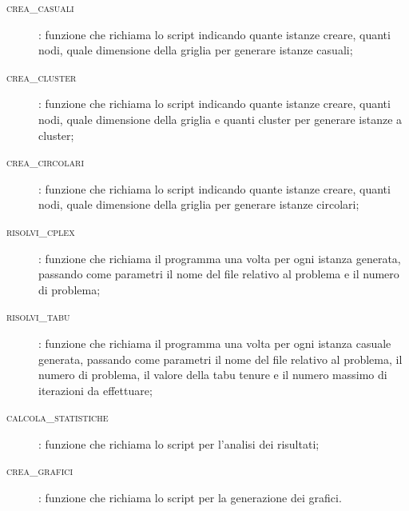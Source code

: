 \begin{description}
	\item[\textsc{crea\_casuali}]: funzione che richiama lo script  indicando quante istanze creare, quanti nodi, quale dimensione della griglia per generare istanze casuali;
	\item[\textsc{crea\_cluster}]: funzione che richiama lo script  indicando quante istanze creare, quanti nodi, quale dimensione della griglia e quanti cluster per generare istanze a cluster;
	\item[\textsc{crea\_circolari}]: funzione che richiama lo script  indicando quante istanze creare, quanti nodi, quale dimensione della griglia per generare istanze circolari;
	\item[\textsc{risolvi\_cplex}]: funzione che richiama il programma  una volta per ogni istanza generata, passando come parametri il nome del file relativo al problema e il numero di problema;
	\item[\textsc{risolvi\_tabu}]: funzione che richiama il programma  una volta per ogni istanza casuale generata, passando come parametri il nome del file relativo al problema, il numero di problema, il valore della tabu tenure e il numero massimo di iterazioni da effettuare;
	\item[\textsc{calcola\_statistiche}]: funzione che richiama lo script  per l'analisi dei risultati;
	\item[\textsc{crea\_grafici}]: funzione che richiama lo script  per la generazione dei grafici.
\end{description}